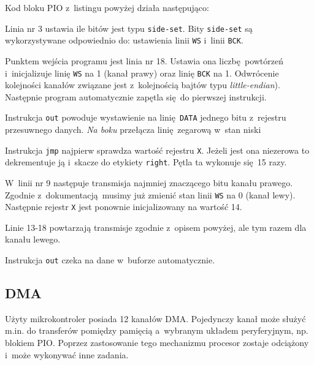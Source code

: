 \documentclass[polish]{aghengthesis}
\let\tempone\itemize
\let\temptwo\enditemize
\renewenvironment{itemize}{\tempone\setlength{\itemsep}{0cm}}{\temptwo}
\begin{document}
			\noindent
			Kod bloku PIO z~listingu powyżej działa następująco:
			\begin{itemize}
				\item Linia nr 3 ustawia ile bitów jest typu \lstinline|side-set|. Bity \lstinline|side-set| są wykorzystywane odpowiednio do: ustawienia linii \lstinline|WS| i~linii \lstinline|BCK|.
				
				\item Punktem wejścia programu jest linia nr 18. Ustawia ona liczbę powtórzeń i~inicjalizuje linię \lstinline|WS| na 1 (kanał prawy) oraz linię \lstinline|BCK| na 1. Odwrócenie kolejności kanałów związane jest z~kolejnością bajtów typu \textit{little-endian}). Następnie program automatycznie zapętla się do pierwszej instrukcji.
				
				\item Instrukcja \lstinline|out| powoduje wystawienie na linię \lstinline|DATA| jednego bitu z~rejestru przesuwnego danych. \textit{Na boku} przełącza linię zegarową w~stan niski
				
				\item Instrukcja \lstinline|jmp| najpierw sprawdza wartość rejestru \lstinline|X|. Jeżeli jest ona niezerowa to dekrementuje ją i~skacze do etykiety \lstinline|right|. Pętla ta wykonuje się 15 razy.
				
				\item W~linii nr 9 następuje transmisja najmniej znaczącego bitu kanału prawego. Zgodnie z~dokumentacją musimy już zmienić stan linii \lstinline|WS| na 0 (kanał lewy). Następnie rejestr \lstinline|X| jest ponownie inicjalizowany na wartość 14.
				
				\item Linie 13-18 powtarzają transmisje zgodnie z~opisem powyżej, ale tym razem dla kanału lewego.
			\end{itemize}
			
			Instrukcja \lstinline|out| czeka na dane w~buforze automatycznie.
		
		\subsection{DMA}
			Użyty mikrokontroler posiada 12 kanałów DMA.
			Pojedynczy kanał może służyć m.in. do transferów pomiędzy pamięcią a~wybranym układem peryferyjnym, np. blokiem PIO.
			Poprzez zastosowanie tego mechanizmu procesor zostaje odciążony i~może wykonywać inne zadania.
			$ $\\
			
\end{document}
